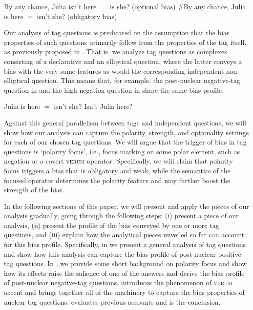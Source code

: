\documentclass[output=paper,colorlinks,citecolor=brown]{langscibook}
\begin{document}
\is{}
\ea By any chance, Julia isn't here $=$ is she? \hfill (optional bias)\label{Bias.Opt}
\ex \#By any chance, Julia is here $=$ isn't she? \hfill (obligatory bias)\label{Bias.Obl}
\z
{}

Our analysis of tag questions is predicated on the assumption that the bias properties of such questions primarily follow from the properties of the tag itself, as previously proposed in \citet{romero2004}. That is, we analyze tag questions as complexes consisting of a declarative and an elliptical question, where the latter conveys a bias with the very same features as would the corresponding independent non-elliptical question. This means that, for example, the post-nuclear negative-tag question in  and the high negation question in  share the same bias profile.

\is{}
\ea Julia is here $=$ isn't she? \label{Bias.Tag}
\ex Isn't Julia here? \label{Bias.HNQ}
\z
{}

\noindent 
Against this general parallelism between tags and independent questions, we will show how our analysis can capture the polarity, strength, and optionality settings for each of our chosen tag questions. We will argue that the trigger of bias in tag questions is `polarity focus', i.e., focus marking on some polar element, such as negation or a covert \textsc{verum} operator. Specifically, we will claim that polarity focus triggers a bias that is obligatory and weak, while the semantics of the focused operator determines the polarity feature and may further boost the strength of the bias. 

In the following sections of this paper, we will present and apply the pieces of our analysis gradually, going through the following steps: (i) present a piece of our analysis, (ii) present the profile of the bias conveyed by one or more tag questions, and (iii) explain how the analytical pieces unveiled so far can account for this bias profile. Specifically, in  we present a general analysis of tag questions and show how this analysis can capture the bias profile of post-nuclear positive-tag questions. In , we provide some short background on polarity focus and show how its effects raise the salience of one of the answers and derive the bias profile of post-nuclear negative-tag questions.  introduces the phenomenon of \textsc{verum} accent and brings together all of the machinery to capture the bias properties of nuclear tag questions.  evaluates previous accounts and  is the conclusion. 
\end{document}
